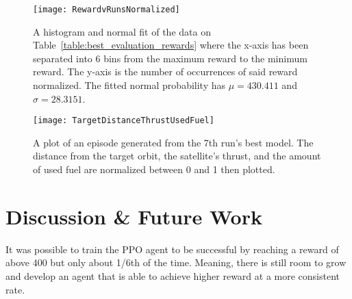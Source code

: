 \begin{figure}
	\centering
	\texttt{[image: RewardvRunsNormalized]}
	\caption{A histogram and normal fit of the data on Table~\ref{table:best_evaluation_rewards} where the x-axis has been separated into 6 bins from the maximum reward to the minimum reward. The y-axis is the number of occurrences of said reward normalized. The fitted normal probability has $\mu=430.411$ and $\sigma=28.3151$.}
	\label{fig:norm_hist_reward}
\end{figure}

\begin{figure}
	\centering
	\texttt{[image: TargetDistanceThrustUsedFuel]}
	\caption{A plot of an episode generated from the 7th run's best model. The distance from the target orbit, the satellite's thrust, and the amount of used fuel are normalized between 0 and 1 then plotted.}
	\label{fig:tdtuf}
\end{figure}

\section{Discussion \& Future Work}

It was possible to train the PPO agent to be successful by reaching a reward of above 400 but only about 1/6th of the time. Meaning, there is still room to grow and develop an agent that is able to achieve higher reward at a more consistent rate. 